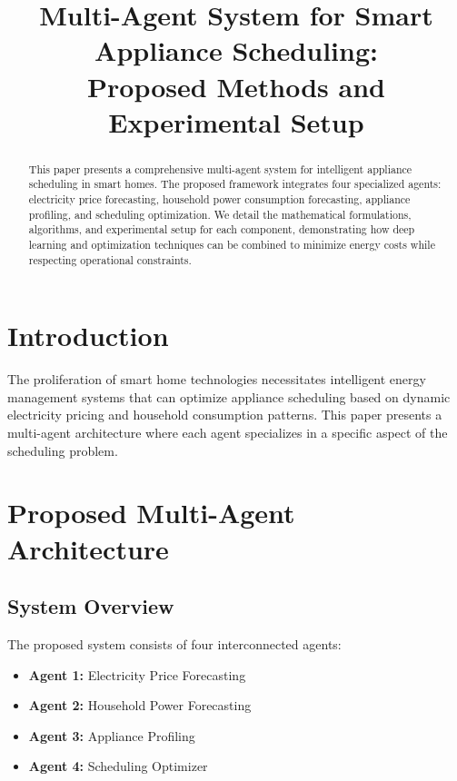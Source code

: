 \documentclass[conference]{IEEEtran}
\begin{document}
\title{Multi-Agent System for Smart Appliance Scheduling: \\Proposed Methods and Experimental Setup}

\author{
}

\maketitle

\begin{abstract}
This paper presents a comprehensive multi-agent system for intelligent appliance scheduling in smart homes. The proposed framework integrates four specialized agents: electricity price forecasting, household power consumption forecasting, appliance profiling, and scheduling optimization. We detail the mathematical formulations, algorithms, and experimental setup for each component, demonstrating how deep learning and optimization techniques can be combined to minimize energy costs while respecting operational constraints.
\end{abstract}

\section{Introduction}
The proliferation of smart home technologies necessitates intelligent energy management systems that can optimize appliance scheduling based on dynamic electricity pricing and household consumption patterns. This paper presents a multi-agent architecture where each agent specializes in a specific aspect of the scheduling problem.

\section{Proposed Multi-Agent Architecture}

\subsection{System Overview}
The proposed system consists of four interconnected agents:
\begin{itemize}
    \item \textbf{Agent 1:} Electricity Price Forecasting
    \item \textbf{Agent 2:} Household Power Forecasting
    \item \textbf{Agent 3:} Appliance Profiling
    \item \textbf{Agent 4:} Scheduling Optimizer
\end{itemize}
\end{document}
